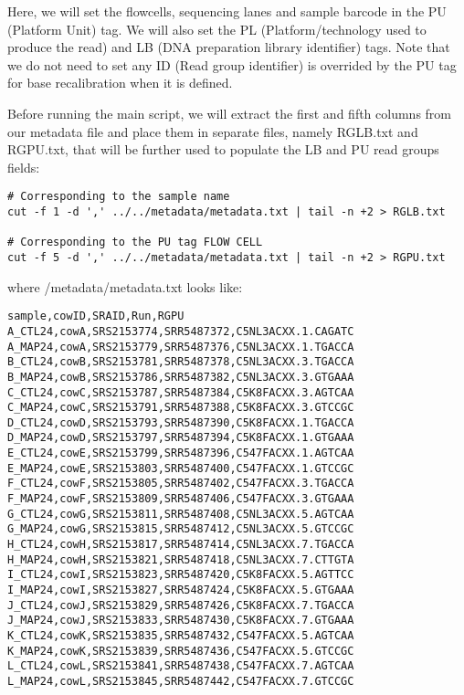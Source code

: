 Here, we will set the flowcells, sequencing lanes and sample barcode in the PU (Platform Unit) tag. We will also set the PL (Platform/technology used to produce the read) and LB (DNA preparation library identifier) tags. Note that we do not need to set any ID (Read group identifier) is overrided by the PU tag for base recalibration when it is defined.


Before running the main script, we will extract the first and fifth columns from our metadata file and place them in separate files, namely RGLB.txt and  RGPU.txt, that will be further used to populate the LB and PU read groups fields:

\begin{verbatim}
# Corresponding to the sample name
cut -f 1 -d ',' ../../metadata/metadata.txt | tail -n +2 > RGLB.txt

# Corresponding to the PU tag FLOW CELL 
cut -f 5 -d ',' ../../metadata/metadata.txt | tail -n +2 > RGPU.txt
\end{verbatim}

where /metadata/metadata.txt looks like:

\begin{verbatim}
sample,cowID,SRAID,Run,RGPU
A_CTL24,cowA,SRS2153774,SRR5487372,C5NL3ACXX.1.CAGATC
A_MAP24,cowA,SRS2153779,SRR5487376,C5NL3ACXX.1.TGACCA
B_CTL24,cowB,SRS2153781,SRR5487378,C5NL3ACXX.3.TGACCA
B_MAP24,cowB,SRS2153786,SRR5487382,C5NL3ACXX.3.GTGAAA
C_CTL24,cowC,SRS2153787,SRR5487384,C5K8FACXX.3.AGTCAA
C_MAP24,cowC,SRS2153791,SRR5487388,C5K8FACXX.3.GTCCGC
D_CTL24,cowD,SRS2153793,SRR5487390,C5K8FACXX.1.TGACCA
D_MAP24,cowD,SRS2153797,SRR5487394,C5K8FACXX.1.GTGAAA
E_CTL24,cowE,SRS2153799,SRR5487396,C547FACXX.1.AGTCAA
E_MAP24,cowE,SRS2153803,SRR5487400,C547FACXX.1.GTCCGC
F_CTL24,cowF,SRS2153805,SRR5487402,C547FACXX.3.TGACCA
F_MAP24,cowF,SRS2153809,SRR5487406,C547FACXX.3.GTGAAA
G_CTL24,cowG,SRS2153811,SRR5487408,C5NL3ACXX.5.AGTCAA
G_MAP24,cowG,SRS2153815,SRR5487412,C5NL3ACXX.5.GTCCGC
H_CTL24,cowH,SRS2153817,SRR5487414,C5NL3ACXX.7.TGACCA
H_MAP24,cowH,SRS2153821,SRR5487418,C5NL3ACXX.7.CTTGTA
I_CTL24,cowI,SRS2153823,SRR5487420,C5K8FACXX.5.AGTTCC
I_MAP24,cowI,SRS2153827,SRR5487424,C5K8FACXX.5.GTGAAA
J_CTL24,cowJ,SRS2153829,SRR5487426,C5K8FACXX.7.TGACCA
J_MAP24,cowJ,SRS2153833,SRR5487430,C5K8FACXX.7.GTGAAA
K_CTL24,cowK,SRS2153835,SRR5487432,C547FACXX.5.AGTCAA
K_MAP24,cowK,SRS2153839,SRR5487436,C547FACXX.5.GTCCGC
L_CTL24,cowL,SRS2153841,SRR5487438,C547FACXX.7.AGTCAA
L_MAP24,cowL,SRS2153845,SRR5487442,C547FACXX.7.GTCCGC
\end{verbatim}


